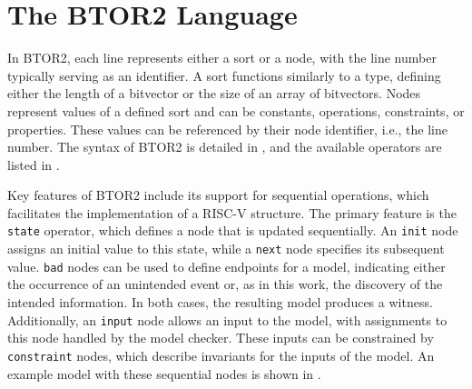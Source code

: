 \section{The BTOR2 Language}
In BTOR2, each line represents either a sort or a node, with the line
number typically serving as an identifier. A sort functions similarly
to a type, defining either the length of a bitvector or the size of
an array of bitvectors. Nodes represent values of a defined sort and
can be constants, operations, constraints, or properties. These
values can be referenced by their node identifier, i.e., the line
number. The syntax of BTOR2 is detailed in \cite[Figure 1]{btor2},
and the available operators are listed in \cite[Table 1]{btor2}.

Key features of BTOR2 include its support for sequential operations,
which facilitates the implementation of a RISC-V structure. The
primary feature is the \texttt{state} operator, which defines a node
that is updated sequentially. An \texttt{init} node assigns an
initial value to this state, while a \texttt{next} node specifies its
subsequent value. \texttt{bad} nodes can be used to define endpoints
for a model, indicating either the occurrence of an unintended event
or, as in this work, the discovery of the intended information. In
both cases, the resulting model produces a witness. Additionally, an
\texttt{input} node allows an input to the model, with assignments to
this node handled by the model checker. These inputs can be
constrained by \texttt{constraint} nodes, which describe invariants
for the inputs of the model. An example model with these sequential
nodes is shown in .
